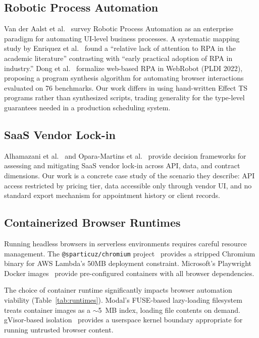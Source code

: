 \documentclass[conference]{IEEEtran}
\begin{document}
\subsection{Robotic Process Automation}

Van der Aalst et al.~\cite{vanderaalst-rpa} survey Robotic Process Automation as an enterprise paradigm for automating UI-level business processes. A systematic mapping study by Enriquez et al.~\cite{enriquez-rpa-mapping} found a ``relative lack of attention to RPA in the academic literature'' contrasting with ``early practical adoption of RPA in industry.'' Dong et al.~\cite{dong-webrobot} formalize web-based RPA in WebRobot (PLDI 2022), proposing a program synthesis algorithm for automating browser interactions evaluated on 76 benchmarks. Our work differs in using hand-written Effect TS programs rather than synthesized scripts, trading generality for the type-level guarantees needed in a production scheduling system.

\subsection{SaaS Vendor Lock-in}

Alhamazani et al.~\cite{alhamazani-lockin} and Opara-Martins et al.~\cite{opara-lockin} provide decision frameworks for assessing and mitigating SaaS vendor lock-in across API, data, and contract dimensions. Our work is a concrete case study of the scenario they describe: API access restricted by pricing tier, data accessible only through vendor UI, and no standard export mechanism for appointment history or client records.

\subsection{Containerized Browser Runtimes}

Running headless browsers in serverless environments requires careful resource management. The \texttt{@sparticuz/chromium} project~\cite{sparticuz-chromium} provides a stripped Chromium binary for AWS Lambda's 50MB deployment constraint. Microsoft's Playwright Docker images~\cite{playwright-docker} provide pre-configured containers with all browser dependencies.

The choice of container runtime significantly impacts browser automation viability (Table~\ref{tab:runtimes}). Modal's FUSE-based lazy-loading filesystem~\cite{modal-fuse} treats container images as a $\sim$5~MB index, loading file contents on demand. gVisor-based isolation~\cite{gvisor} provides a userspace kernel boundary appropriate for running untrusted browser content.
\end{document}
